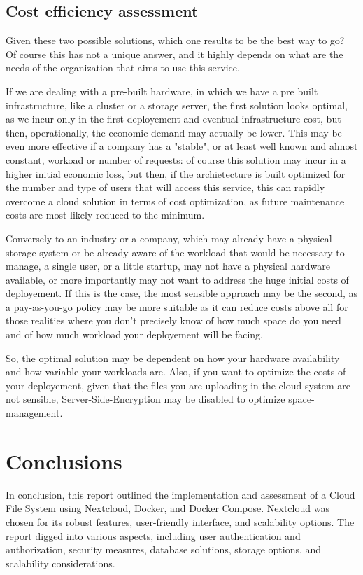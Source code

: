 \documentclass{article}
\begin{document}
	\subsection{Cost efficiency assessment}
	Given these two possible solutions, which one results to be the best way to go? Of course this has not a unique answer, and it highly depends on what are the needs of the organization that aims to use this service.
	
	If we are dealing with a pre-built hardware, in which we have a pre built infrastructure, like a cluster or a storage server, the first solution looks optimal, as we incur only in the first deployement and eventual infrastructure cost, but then, operationally, the economic demand may actually be lower. This may be even more effective if a company has a "stable", or at least well known and almost constant, workoad or number of requests: of course this solution may incur in a higher initial economic loss, but then, if the archietecture is built optimized for the number and type of users that will access this service, this can rapidly overcome a cloud solution in terms of cost optimization, as future maintenance costs are most likely reduced to the minimum.
	
	Conversely to an industry or a company, which may already have a physical storage system or be already aware of the workload that would be necessary to manage, a single user, or a little startup, may not have a physical hardware available, or more importantly may not want to address the huge initial costs of deployement. If this is the case, the most sensible approach may be the second, as a pay-as-you-go policy may be more suitable as it can reduce costs above all for those realities where you don't precisely know of how much space do you need and of how much workload your deployement will be facing.
	
	So, the optimal solution may be dependent on how your hardware availability and how variable your workloads are. Also, if you want to optimize the costs of your deployement, given that the files you are uploading in the cloud system are not sensible, Server-Side-Encryption may be disabled to optimize space-management.
	
	\section{Conclusions}
	In conclusion, this report outlined the implementation and assessment of a Cloud File System using Nextcloud, Docker, and Docker Compose. Nextcloud was chosen for its robust features, user-friendly interface, and scalability options. The report digged into various aspects, including user authentication and authorization, security measures, database solutions, storage options, and scalability considerations.
	
\end{document}
